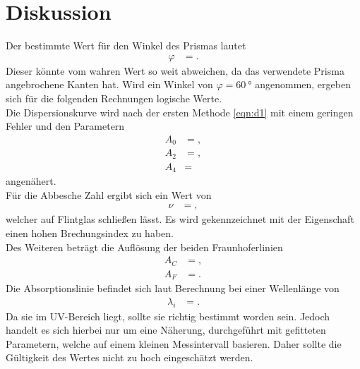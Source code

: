 \section{Diskussion}
\label{sec:Diskussion}
Der bestimmte Wert für den Winkel des Prismas lautet
\begin{align*}
  \varphi &= .
\end{align*}
Dieser könnte vom wahren Wert so weit abweichen, da das verwendete Prisma angebrochene Kanten hat.
Wird ein Winkel von $\varphi = \SI{60}{\degree}$ angenommen, ergeben sich für die folgenden Rechnungen logische Werte.\\
Die Dispersionskurve wird nach der ersten Methode \eqref{eqn:d1} mit einem geringen Fehler und den Parametern
\begin{align*}
A_0 &= ,\\
A_2 &= ,\\
A_4 &= 
\end{align*}
angenähert.\\
Für die Abbesche Zahl ergibt sich ein Wert von
\begin{align*}
  \nu &= ,
\end{align*}
welcher auf Flintglas schließen lässt.
Es wird gekennzeichnet mit der Eigenschaft einen hohen Brechungsindex zu haben.\\
Des Weiteren beträgt die Auflösung der beiden Fraunhoferlinien
\begin{align*}
A_C &= ,\\
A_F &= .
\end{align*}
Die Absorptionslinie befindet sich laut Berechnung bei einer Wellenlänge von
\begin{align*}
  \lambda_i &= .
\end{align*}
Da sie im UV-Bereich liegt, sollte sie richtig bestimmt worden sein.
Jedoch handelt es sich hierbei nur um eine Näherung, durchgeführt mit gefitteten Parametern, welche auf einem kleinen Messintervall basieren.
Daher sollte die Gültigkeit des Wertes nicht zu hoch eingeschätzt werden.


